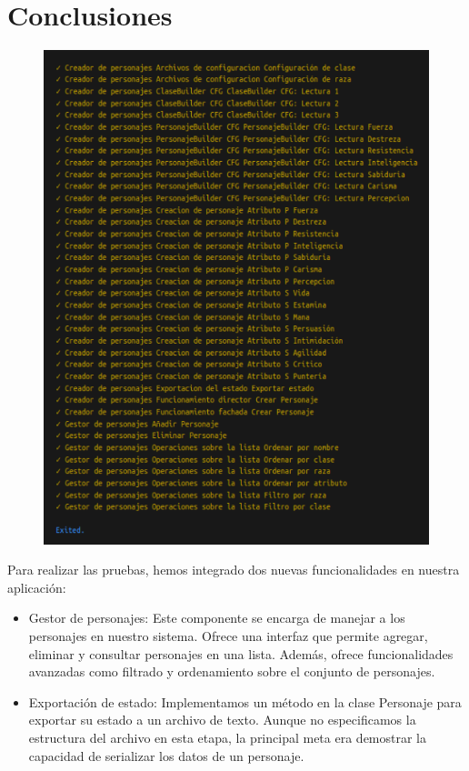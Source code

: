 \documentclass{article}
\begin{document}
\section{Conclusiones}
\begin{figure}
\includegraphics[width=\linewidth]{ejecucion_tests.png}
\end{figure}
Para realizar las pruebas, hemos integrado dos nuevas funcionalidades en nuestra aplicación:

\begin{itemize}
\item Gestor de personajes: Este componente se encarga de manejar a los personajes en nuestro sistema. Ofrece una interfaz que permite agregar, eliminar y consultar personajes en una lista. Además, ofrece funcionalidades avanzadas como filtrado y ordenamiento sobre el conjunto de personajes.


\item Exportación de estado: Implementamos un método en la clase Personaje para exportar su estado a un archivo de texto. Aunque no especificamos la estructura del archivo en esta etapa, la principal meta era demostrar la capacidad de serializar los datos de un personaje.

\end{itemize}
\end{document}
